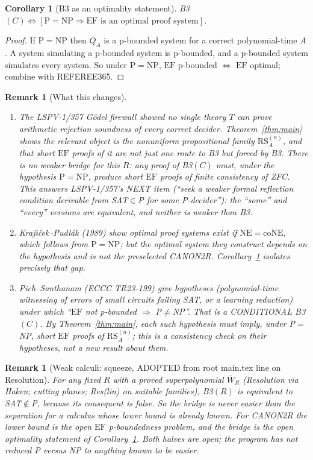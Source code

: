 \documentclass[11pt]{article}
\newtheorem{corollary}[theorem]{Corollary}
\newtheorem{remark}[theorem]{Remark}
\newcommand{\EF}{\mathrm{EF}}
\newcommand{\RS}{\mathrm{RS}}
\begin{document}
\begin{corollary}[B3 as an optimality statement]\label{cor:opt}
B3$(C)\iff[\mathrm P=\mathrm{NP}\Rightarrow\EF\text{ is an optimal proof system}]$.
\end{corollary}
\begin{proof}
If $\mathrm P=\mathrm{NP}$ then $Q_A$ is a p-bounded system for a correct polynomial-time $A$. A system
simulating a p-bounded system is p-bounded, and a p-bounded system simulates every system. So under
$\mathrm P=\mathrm{NP}$, $\EF$ p-bounded $\iff$ $\EF$ optimal; combine with REFEREE365.
\end{proof}

\begin{remark}[What this changes]
\begin{enumerate}
\item The LSPV-1/357 G\"odel firewall showed no single theory $T$ can prove \emph{arithmetic} rejection
soundness of every correct decider. Theorem~\ref{thm:main} shows the relevant object is the
\emph{nonuniform propositional} family $\RS_A^{(n)}$, and that short $\EF$ proofs of it are not just
one route to B3 but \emph{forced} by B3. There is no weaker bridge for this $R$: any proof of B3$(C)$
must, under the hypothesis $\mathrm P=\mathrm{NP}$, produce short $\EF$ proofs of finite consistency of ZFC.
This answers LSPV-1/357's NEXT item (``seek a weaker formal reflection condition derivable from
SAT$\in$P for some P-decider''): the ``some'' and ``every'' versions are equivalent, and neither is
weaker than B3.
\item Kraj\'{\i}\v{c}ek--Pudl\'ak (1989) show optimal proof systems exist if $\mathrm{NE}=\mathrm{coNE}$,
which follows from $\mathrm P=\mathrm{NP}$; but the optimal system they construct depends on the
hypothesis and is not the preselected CANON2R. Corollary~\ref{cor:opt} isolates precisely that gap.
\item Pich--Santhanam (ECCC TR23-199) give hypotheses (polynomial-time witnessing of errors of small
circuits failing SAT, or a learning reduction) under which ``$\EF$ not p-bounded $\Rightarrow$
P$\ne$NP''. That is a CONDITIONAL B3$(C)$. By Theorem~\ref{thm:main}, each such hypothesis must imply,
under P$=$NP, short $\EF$ proofs of $\RS_A^{(n)}$; this is a consistency check on their hypotheses, not
a new result about them.
\end{enumerate}
\end{remark}

\begin{remark}[Weak calculi: squeeze, ADOPTED from root main.tex line on Resolution]
For any fixed $R$ with a \emph{proved} superpolynomial $\overline W_R$ (Resolution via Haken; cutting
planes; Res(lin) on suitable families), B3$(R)$ is equivalent to SAT$\notin$P, because its consequent
is false. So the bridge is never easier than the separation for a calculus whose lower bound is already
known. For CANON2R the lower bound is the open $\EF$ p-boundedness problem, and the bridge is the
open optimality statement of Corollary~\ref{cor:opt}. Both halves are open; the program has not reduced
P versus NP to anything known to be easier.
\end{remark}
\end{document}

